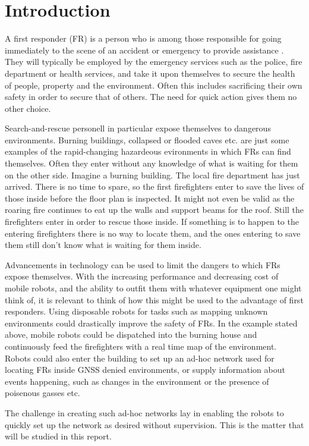 \section{Introduction}

A first responder (FR) is a person who is among those responsible for going immediately to the scene of an accident or emergency to provide assistance \cite{FR}.
They will typically be employed by the emergency services such as the police, fire department or health services, and take it upon themselves to secure the health of people, property and the environment.
Often this includes sacrificing their own safety in order to secure that of others. The need for quick action gives them no other choice.

Search-and-rescue personell in particular expose themselves to dangerous environments. Burning buildings, collapsed or flooded caves etc. are just some examples of the rapid-changing
hazardeous evironments in which FRs can find themselves. Often they enter without any knowledge of what is waiting for them on the other side. Imagine a burning building. The local fire department has just arrived. There is no time to 
spare, so the first firefighters enter to save the lives of those inside before the floor plan is inspected. It might not even be valid as the roaring fire continues to eat up the walls and support beams for the roof. Still the firefighters enter in order to rescue those inside.
If something is to happen to the entering firefighters there is no way to locate them, and the ones entering to save them still don't know what is waiting for them inside.

Advancements in technology can be used to limit the dangers to which FRs expose themselves. With the increasing performance and decreasing cost of mobile robots, and the ability to outfit them with whatever equipment one might think of, it is relevant to think of how 
this might be used to the advantage of first responders. Using disposable robots for tasks such as mapping unknown environments could drastically improve the safety of FRs. In the example stated above, mobile robots could be dispatched into the burning house
and continuously feed the firefighters with a real time map of the environment. Robots could also enter the building to set up an ad-hoc network \cite{GAVHALE2016477} used for locating FRs inside GNSS denied environments, or supply information about events happening, such as changes in the environment or the
presence of poisenous gasses etc.

The challenge in creating such ad-hoc networks lay in enabling the robots to quickly set up the network as desired without supervision. This is the matter that will be studied in this report.